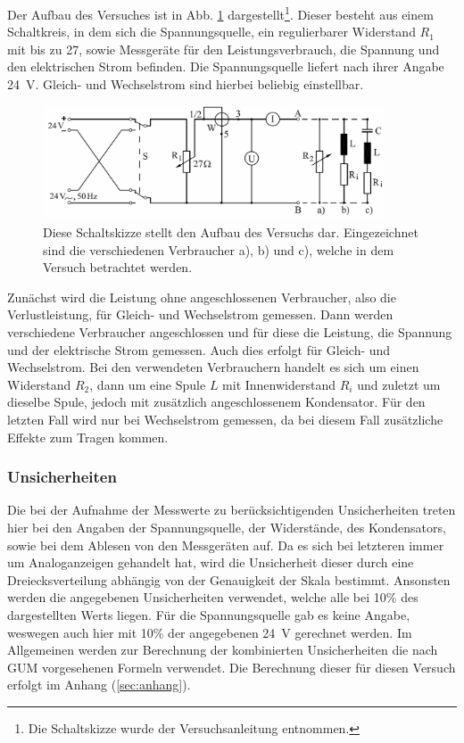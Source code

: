 Der Aufbau des Versuches ist in Abb. \ref{fig:Schaltskizze} dargestellt\footnote{Die Schaltskizze wurde der Versuchsanleitung entnommen.}.
Dieser besteht aus einem Schaltkreis, in dem sich die Spannungsquelle, ein regulierbarer Widerstand  $R_1$ mit bis zu \SI{27}{\Omega}, sowie Messgeräte für den Leistungsverbrauch, die Spannung und den elektrischen Strom befinden. 
Die Spannungsquelle liefert nach ihrer Angabe \SI{24}{\V}. Gleich- und Wechselstrom sind hierbei beliebig einstellbar.
\begin{figure}[ht]
	\centering
	\includegraphics[width=0.9\textwidth]{auswertung/Schaltung2.png}
	\caption{Diese Schaltskizze stellt den Aufbau des Versuchs dar. Eingezeichnet sind die verschiedenen Verbraucher a), b) und c), welche in dem Versuch betrachtet werden.}
	\label{fig:Schaltskizze}	
\end{figure}
Zunächst wird die Leistung ohne angeschlossenen Verbraucher, also die Verlustleistung, für Gleich- und Wechselstrom gemessen. 
Dann werden verschiedene Verbraucher angeschlossen und für diese die Leistung, die Spannung und der elektrische Strom gemessen.
Auch dies erfolgt für Gleich- und Wechselstrom.
Bei den verwendeten Verbrauchern handelt es sich um einen Widerstand $R_2$, dann um eine Spule $L$ mit Innenwiderstand $R_i$ und zuletzt um dieselbe Spule, jedoch mit zusätzlich angeschlossenem Kondensator.
Für den letzten Fall wird nur bei Wechselstrom gemessen, da bei diesem Fall zusätzliche Effekte zum Tragen kommen.

\subsubsection{Unsicherheiten}

Die bei der Aufnahme der Messwerte zu berücksichtigenden Unsicherheiten treten hier bei den Angaben der Spannungsquelle, der Widerstände, des Kondensators, sowie bei dem Ablesen von den Messgeräten auf. 
Da es sich bei letzteren immer um Analoganzeigen gehandelt hat, wird die Unsicherheit dieser durch eine Dreiecksverteilung abhängig von der Genauigkeit der Skala bestimmt. 
Ansonsten werden die angegebenen Unsicherheiten verwendet, welche alle bei 10\% des dargestellten Werts liegen. Für die Spannungsquelle gab es keine Angabe, weswegen auch hier mit 10\% der angegebenen \SI{24}{\V} gerechnet werden.
Im Allgemeinen werden zur Berechnung der kombinierten Unsicherheiten die nach GUM vorgesehenen Formeln verwendet. 
Die Berechnung dieser für diesen Versuch erfolgt im Anhang (\ref*{sec:anhang}).

